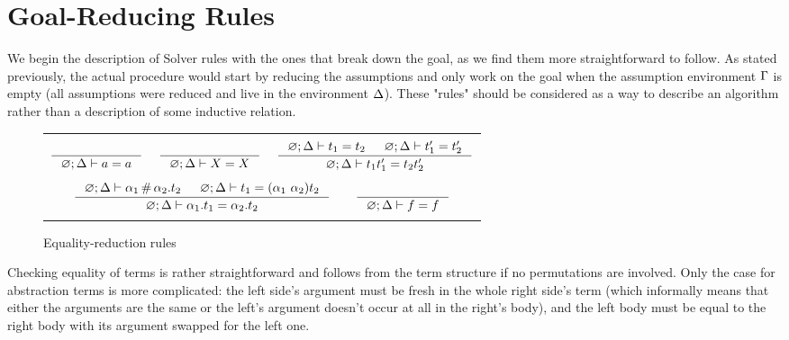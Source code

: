 \documentclass[english, mgr]{iithesis}
\newcommand{\solverRule}{\vdash}
\begin{document}
\section{Goal-Reducing Rules}
We begin the description of Solver rules with the ones that break down the goal,
as we find them more straightforward to follow.
As stated previously, the actual procedure would start by reducing the assumptions
and only work on the goal when the assumption environment $\Gamma$ is empty
(all assumptions were reduced and live in the environment $\Delta$).
These "rules" should be considered as a way to describe an algorithm
rather than a description of some inductive relation.

\begin{figure}[htbp]
    \centering
    \begin{tabularx}{\textwidth}{|C|}
      \hline \\ $
      \inference{
      }{
        \emptyenv ; \icEnv \solverRule \atomv = \atomv
      }
      \quad\;
      \inference{
      }{
        \emptyenv ; \icEnv \solverRule \termv = \termv
      }
      \quad\;
      \inference{
        \emptyenv ; \icEnv \solverRule \term_1 = \term_2
        &
        \emptyenv ; \icEnv \solverRule \term_1' = \term_2'
      }{
        \emptyenv ; \icEnv \solverRule \term_1 \term_1' = \term_2 \term_2'
      }
      $ \\ \\ $
      \inference{
        \emptyenv ; \icEnv \solverRule \atomexp_1 \cfresh \tbind{\atomexp_2}\term_2
        &
        \emptyenv ; \icEnv \solverRule \term_1 = \permswap{\atomexp_1}{\atomexp_2} \term_2
      }{
        \emptyenv ; \icEnv \solverRule \tbind{\atomexp_1} \term_1 = \tbind{\atomexp_2} \term_2
      } \qquad
      \inference{
      }{
        \emptyenv ; \icEnv \solverRule \symb = \symb
      }
      $ \\ \\ \hline
      \end{tabularx}
  \caption{Equality-reduction rules}
  \label{fig:equality-reduction-rules}
\end{figure}
Checking equality of terms is rather straightforward and follows from the
term structure if no permutations are involved.
Only the case for abstraction terms is more complicated:
the left side's argument must be fresh in the whole right side's term
(which informally means that either the arguments are the same or
the left's argument doesn't occur at all in the right's body),
and the left body must be equal to the right body with its argument swapped for the left one.
\end{document}
